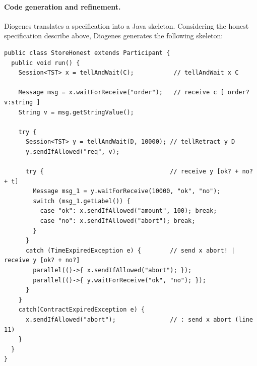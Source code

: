 \paragraph{Code generation and refinement.}
Diogenes translates a \coco specification
into a Java skeleton.
Considering the honest specification describe above,
Diogenes generates the following skeleton:
\begin{mdframed}
  \begin{verbatim}
public class StoreHonest extends Participant { 
  public void run() {
    Session<TST> x = tellAndWait(C);           // tellAndWait x C
    
    Message msg = x.waitForReceive("order");   // receive c [ order? v:string ]
    String v = msg.getStringValue();
    
    try {
      Session<TST> y = tellAndWait(D, 10000); // tellRetract y D
      y.sendIfAllowed("req", v);
      
      try {                                   // receive y [ok? + no? + t]
        Message msg_1 = y.waitForReceive(10000, "ok", "no");
        switch (msg_1.getLabel()) {                    
          case "ok": x.sendIfAllowed("amount", 100); break;
          case "no": x.sendIfAllowed("abort"); break;                    
        }
      }
      catch (TimeExpiredException e) {        // send x abort! | receive y [ok? + no?] 
        parallel(()->{ x.sendIfAllowed("abort"); });
        parallel(()->{ y.waitForReceive("ok", "no"); });
      }            
    }
    catch(ContractExpiredException e) {
      x.sendIfAllowed("abort");               // : send x abort (line 11)
    } 
  }
}
  \end{verbatim}
\end{mdframed}



